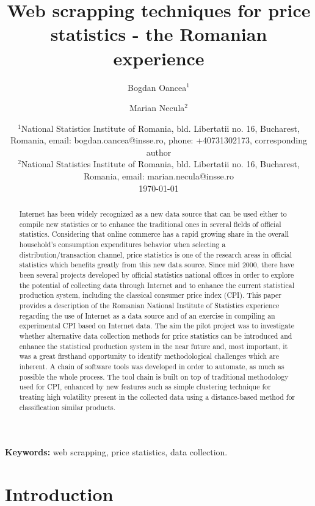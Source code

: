 \documentclass[]{article}
\title{Web scrapping techniques for price statistics -  the Romanian experience}
\author{Bogdan Oancea$^1$ \and Marian Necula$^2$}
\date{%
	$^1$National Statistics Institute of Romania, bld. Libertatii no. 16, Bucharest, Romania, email: bogdan.oancea@insse.ro, phone: +40731302173, corresponding author\\%
	$^2$National Statistics Institute of Romania, bld. Libertatii no. 16, Bucharest, Romania, email: marian.necula@insse.ro\\[2ex]%
	\today
}
\begin{document}
\maketitle

\begin{abstract}
Internet has been widely recognized as a new data source that can be used either to compile new statistics or to enhance the 
traditional ones in several fields of official statistics. Considering that online commerce has a rapid growing share in the 
overall household’s consumption expenditures behavior when selecting a distribution/transaction channel, price statistics is 
one of the research areas in official statistics which benefits greatly from this new data source. Since mid 2000, there have 
been several projects developed by official statistics national offices in order to explore the potential of collecting data 
through Internet and to enhance the current statistical production system, including the classical consumer price index (CPI). 
This paper provides a description of the Romanian National Institute of Statistics experience regarding the use of Internet 
as a data source and of an exercise in compiling an experimental CPI based on Internet data. The aim the pilot project was to 
investigate whether alternative data collection methods for price statistics can be introduced and enhance the statistical 
production system in the near future and, most important, it was a great firsthand opportunity to identify methodological 
challenges which are inherent. A chain of software tools was developed in order to automate, as much as possible the whole process. 
The tool chain is built on top of traditional methodology used for CPI, enhanced by new features such as simple clustering 
technique for treating high volatility present in the collected data using a distance-based method for classification similar products.
\end{abstract}

{\bf Keywords:} web scrapping, price statistics, data collection.

\section{Introduction}
\end{document}
